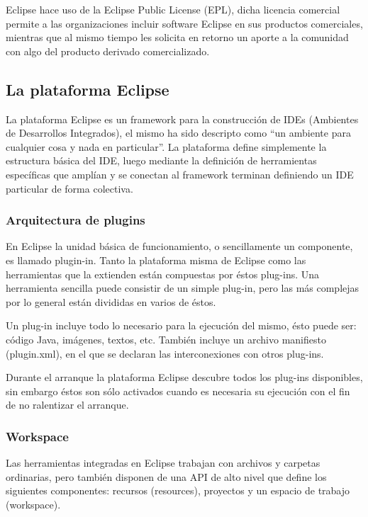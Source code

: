 \documentclass[a4paper,12pt,oneside]{book}
\begin{document}
Eclipse hace uso de la Eclipse Public License (EPL), dicha licencia comercial permite a las organizaciones incluir software Eclipse en sus productos comerciales, mientras que al mismo tiempo les solicita en retorno un aporte a la comunidad con algo del producto derivado comercializado.


\subsection{La plataforma Eclipse}

La plataforma Eclipse es un framework para la construcción de IDEs (Ambientes de Desarrollos Integrados), el mismo ha sido descripto como ``un ambiente para cualquier cosa y nada en particular''. La plataforma  define simplemente la estructura básica del IDE, luego mediante la definición de herramientas específicas que amplían y se conectan al framework terminan definiendo un IDE particular de forma colectiva.


\subsubsection{Arquitectura de plugins}

En Eclipse la unidad básica de funcionamiento, o sencillamente un componente, es llamado plugin-in. Tanto la plataforma misma de Eclipse como las herramientas que la extienden están compuestas por éstos plug-ins. Una  herramienta sencilla puede consistir de un simple plug-in, pero las más complejas por lo general están divididas en varios de éstos.

Un plug-in incluye todo lo necesario para la ejecución del mismo, ésto puede ser: código Java, imágenes, textos, etc. También incluye un archivo manifiesto (plugin.xml), en el que se declaran las interconexiones con otros plug-ins.

Durante el arranque la plataforma Eclipse descubre todos los plug-ins disponibles, sin embargo éstos son sólo activados cuando es necesaria su ejecución con el fin de no ralentizar el arranque.


\subsubsection{Workspace}

Las herramientas integradas en Eclipse trabajan con archivos y carpetas ordinarias, pero también disponen de una API de alto nivel que define los siguientes componentes: recursos (resources), proyectos y un espacio de trabajo (workspace).
\end{document}
